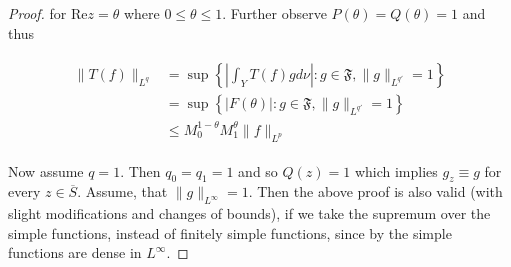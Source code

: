 \begin{proof}
		for $\mathrm{Re}z = \theta$ where $0 \leqslant \theta \leqslant 1$. Further observe $P(\theta) = Q(\theta) = 1$ and thus 
		
		\begin{gather}
			\begin{aligned}
				\|T(f)\|_{L^q} &= \sup\left\{\left\vert \int_Y T(f)gd\nu\right\vert : g \in \mathfrak{F}, \|g\|_{L^{q'}} = 1\right\}\\
				&=  \sup\left\{\left\vert F(\theta)\right\vert : g \in \mathfrak{F}, \|g\|_{L^{q'}} = 1\right\}\\
				&\leqslant M_0^{1 - \theta}M_1^\theta \|f\|_{L^p}
				\label{id:F}
			\end{aligned}
		\end{gather}

		Now assume \underline{$q = 1$}. Then $q_0 = q_1 = 1$ and so $Q(z) = 1$ which implies $g_z \equiv g$ for every $z \in \overline{S}$. Assume, that $\|g\|_{L^\infty} = 1$. Then the above proof is also valid (with slight modifications and changes of bounds), if we take the supremum over the simple functions, instead of finitely simple functions, since by \cite[100]{cohn:measure_theory:2013} the simple functions are dense in $L^{\infty}$.		
\end{proof}
